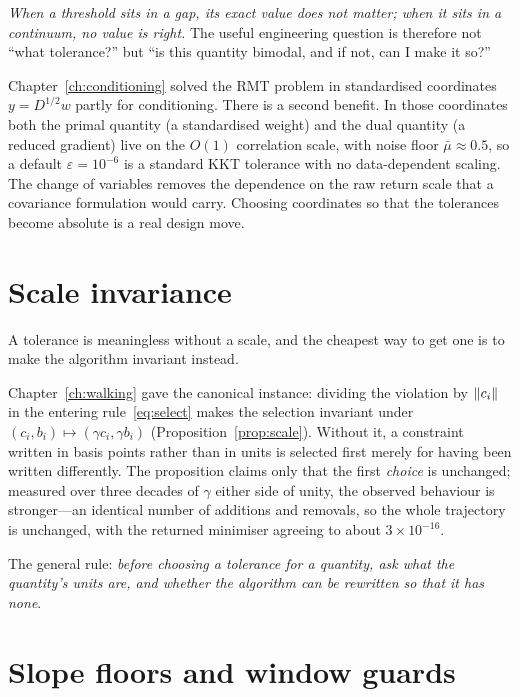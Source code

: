 \emph{When a threshold sits in a gap, its exact value does not matter; when it sits in a
continuum, no value is right.} The useful engineering question is therefore not ``what
tolerance?'' but ``is this quantity bimodal, and if not, can I make it so?''

\begin{example}
Chapter~\ref{ch:conditioning} solved the RMT problem in standardised coordinates
$y = D^{1/2}w$ partly for conditioning. There is a second benefit. In those coordinates
both the primal quantity (a standardised weight) and the dual quantity (a reduced
gradient) live on the $O(1)$ correlation scale, with noise floor $\bar\mu \approx 0.5$,
so a default $\varepsilon = 10^{-6}$ is a standard KKT tolerance with no data-dependent
scaling. The change of variables removes the dependence on the raw return scale that a
covariance formulation would carry. Choosing coordinates so that the tolerances become
absolute is a real design move.
\end{example}

\section{Scale invariance}

A tolerance is meaningless without a scale, and the cheapest way to get one is to make
the algorithm invariant instead.

Chapter~\ref{ch:walking} gave the canonical instance: dividing the violation by
$\lVert c_i \rVert$ in the entering rule~\eqref{eq:select} makes the selection invariant under
$(c_i,b_i)\mapsto(\gamma c_i,\gamma b_i)$ (Proposition~\ref{prop:scale}). Without it, a
constraint written in basis points rather than in units is selected first merely for
having been written differently. The proposition claims only that the first
\emph{choice} is unchanged; measured over three decades of $\gamma$ either side of
unity, the observed behaviour is stronger---an identical number of additions and
removals, so the whole trajectory is unchanged, with the returned minimiser agreeing to
about $3\times10^{-16}$.

The general rule: \emph{before choosing a tolerance for a quantity, ask what the
quantity's units are, and whether the algorithm can be rewritten so that it has none}.

\section{Slope floors and window guards}

